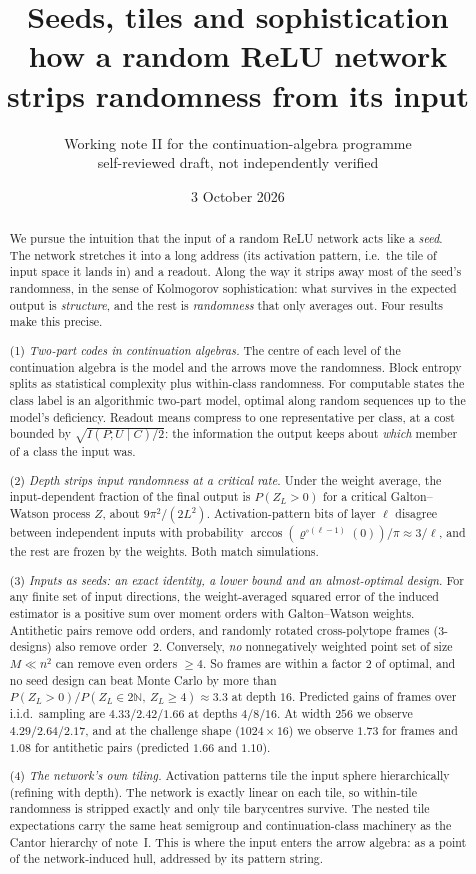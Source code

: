 \documentclass[11pt]{article}
\title{Seeds, tiles and sophistication\\[4pt]
\large how a random ReLU network strips randomness from its input}
\author{Working note II for the continuation-algebra programme\\
\small self-reviewed draft, not independently verified}
\date{3 October 2026}
\theoremstyle{definition}
\theoremstyle{remark}
\newcommand{\N}{\mathbb N}
\begin{document}
\maketitle

\begin{abstract}
We pursue the intuition that the input of a random ReLU network acts like a \emph{seed}. The network stretches it into a long address (its activation pattern, i.e.\ the tile of input space it lands in) and a readout. Along the way it strips away most of the seed's randomness, in the sense of Kolmogorov sophistication: what survives in the expected output is \emph{structure}, and the rest is \emph{randomness} that only averages out. Four results make this precise.

(1) \emph{Two-part codes in continuation algebras.} The centre of each level of the continuation algebra is the model and the arrows move the randomness. Block entropy splits as statistical complexity plus within-class randomness. For computable states the class label is an algorithmic two-part model, optimal along random sequences up to the model's deficiency. Readout means compress to one representative per class, at a cost bounded by $\sqrt{I(P;U\mid C)/2}$: the information the output keeps about \emph{which} member of a class the input was.

(2) \emph{Depth strips input randomness at a critical rate.} Under the weight average, the input-dependent fraction of the final output is $P(Z_L>0)$ for a critical Galton--Watson process $Z$, about $9\pi^2/(2L^2)$. Activation-pattern bits of layer $\ell$ disagree between independent inputs with probability $\arccos(\varrho^{\circ(\ell-1)}(0))/\pi\approx3/\ell$, and the rest are frozen by the weights. Both match simulations.

(3) \emph{Inputs as seeds: an exact identity, a lower bound and an almost-optimal design.} For any finite set of input directions, the weight-averaged squared error of the induced estimator is a positive sum over moment orders with Galton--Watson weights. Antithetic pairs remove odd orders, and randomly rotated cross-polytope frames (3-designs) also remove order~2. Conversely, \emph{no} nonnegatively weighted point set of size $M\ll n^2$ can remove even orders $\ge4$. So frames are within a factor $2$ of optimal, and no seed design can beat Monte Carlo by more than $P(Z_L>0)/P(Z_L\in2\N,\ Z_L\ge4)\approx3.3$ at depth $16$. Predicted gains of frames over i.i.d.\ sampling are $4.33/2.42/1.66$ at depths $4/8/16$. At width $256$ we observe $4.29/2.64/2.17$, and at the challenge shape ($1024\times16$) we observe $1.73$ for frames and $1.08$ for antithetic pairs (predicted $1.66$ and $1.10$).

(4) \emph{The network's own tiling.} Activation patterns tile the input sphere hierarchically (refining with depth). The network is exactly linear on each tile, so within-tile randomness is stripped exactly and only tile barycentres survive. The nested tile expectations carry the same heat semigroup and continuation-class machinery as the Cantor hierarchy of note~I. This is where the input enters the arrow algebra: as a point of the network-induced hull, addressed by its pattern string.
\end{abstract}
\end{document}
